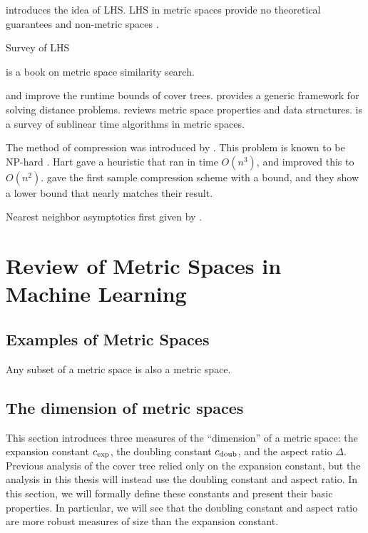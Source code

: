 \documentclass[../main.tex]{subfiles}
\newcommand{\aspect}[1]{\Delta}
\newcommand{\krnum}{c_\textnormal{exp}}
\newcommand{\doubnum}{c_\textnormal{doub}}
\begin{document}
\cite{gionis1999similarity} introduces the idea of LHS.
LHS in metric spaces \cite{tellez2010locality,novak2010locality} provide no theoretical guarantees and non-metric spaces \cite{mu2010non}.

Survey of LHS \cite{wang2014hashing} \cite{wang2016learning}

\cite{zezula2006similarity} is a book on metric space similarity search.

\cite{ram2009linear} and \cite{curtin2015plug} improve the runtime bounds of cover trees.
\cite{curtin2013tree} provides a generic framework for solving distance problems.
\cite{clarkson2006nearest} reviews metric space properties and data structures.
\cite{czumaj2010sublinear} is a survey of sublinear time algorithms in metric spaces.

The method of compression was introduced by \citet{hart1968condensed}.
This problem is known to be NP-hard \citep{zukhba2010np}.
Hart gave a heuristic that ran in time $O(n^3)$,
and\cite{angiulli2005fast} improved this to $O(n^2)$.
\cite{gottlieb2014near} gave the first sample compression scheme with a bound,
and they show a lower bound that nearly matches their result.

Nearest neighbor asymptotics first given by \citet{cover1967nearest}.


\section{Review of Metric Spaces in Machine Learning}


\subsection{Examples of Metric Spaces}

\begin{example}
    Any subset of a metric space is also a metric space.
\end{example}


\subsection{The dimension of metric spaces}

This section introduces three measures of the ``dimension'' of a metric space:
the expansion constant $\krnum$, the doubling constant $\doubnum$, and the aspect ratio $\aspect{}$.
Previous analysis of the cover tree relied only on the expansion constant,
but the analysis in this thesis will instead use the doubling constant and aspect ratio.
In this section, we will formally define these constants and present their basic properties.
In particular, we will see that the doubling constant and aspect ratio are more robust measures of size than the expansion constant.
\end{document}
